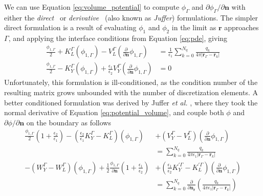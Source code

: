 We can use Equation \eqref{eq:volume_potential} to compute $\phi_\Gamma$ and $\partial\phi_\Gamma/\partial\mathbf{n}$ with either the \emph{direct}~\cite{YoonLenhoff1990} or \emph{derivative}~\cite{JufferETal1991} (also known as \emph{Juffer}) formulations.
The simpler direct formulation is a result of evaluating $\phi_1$ and $\phi_2$ in the limit as $\mathbf{r}$ approaches $\Gamma$, and applying the interface conditions from Equation \eqref{eq:pde}, giving
%
\begin{align} \label{eq:direct}
\frac{\phi_{1,\Gamma}}{2}+ K_{L}^{\Gamma}(\phi_{1,\Gamma}) -  V_{L}^{\Gamma} \left(\frac{\partial}{\partial \mathbf{n}}  \phi_{1,\Gamma}  \right) & = \frac{1}{\epsilon_1} \sum_{k=0}^{N_q}  \frac{q_k}{4\pi|\mathbf{r}_{\Gamma} - \mathbf{r}_k|} \nonumber \\
\frac{\phi_{1,\Gamma}}{2} - K_{Y}^{\Gamma}(\phi_{1,\Gamma}) + \frac{\epsilon_1}{\epsilon_2}V_{Y}^{\Gamma} \left( \frac{\partial}{\partial \mathbf{n}} \phi_{1,\Gamma} \right) & = 0
\end{align}
%
Unfortunately, this formulation is ill-conditioned, as the condition number of the resulting matrix grows unbounded with the number of discretization elements. 
A better conditioned formulation was derived by Juffer \emph{et al.} \cite{JufferETal1991}, where they took the normal derivative of Equation \eqref{eq:potential_volume}, and couple both $\phi$ and $\partial\phi/\partial\mathbf{n}$ on the boundary as follows
%
\begin{align}\label{eq:juffer}
\frac{\phi_{1,\Gamma}}{2}\left(1+\frac{\epsilon_2}{\epsilon_1}\right) - \left(\frac{\epsilon_2}{\epsilon_1}K_Y^\Gamma - K_L^\Gamma\right)(\phi_{1,\Gamma}) &+ \left(V_Y^\Gamma - V_L^\Gamma\right)\left( \frac{\partial}{\partial \mathbf{n}} \phi_{1,\Gamma} \right)\nonumber\\ 
&= \sum_{k=0}^{N_q}  \frac{q_k}{4\pi\epsilon_1|\mathbf{r}_{\Gamma} - \mathbf{r}_k|} \nonumber \\
- \left(W_Y^\Gamma - W_L^\Gamma\right)(\phi_{1,\Gamma}) +  \frac{1}{2}\frac{\phi_{1,\Gamma}}{\partial\mathbf{n}}\left(1+\frac{\epsilon_1}{\epsilon_2}\right) &+ \left(\frac{\epsilon_1}{\epsilon_2}K_Y^{\prime\Gamma} - K_L^{\prime\Gamma}\right)\left( \frac{\partial}{\partial \mathbf{n}} \phi_{1,\Gamma} \right)\nonumber\\ 
&= \sum_{k=0}^{N_q}  \frac{\partial}{\partial\mathbf{n}_\mathbf{r}}\left(\frac{q_k}{4\pi\epsilon_1|\mathbf{r}_{\Gamma} - \mathbf{r}_k|}\right) \nonumber \\
\end{align}
